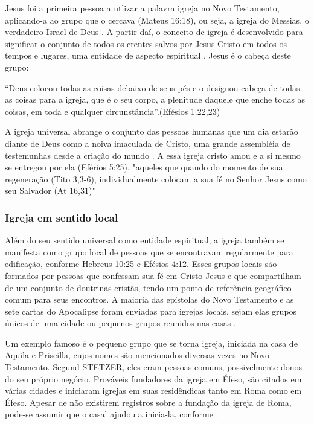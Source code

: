 \documentclass[
	12pt,				%
	openright,			%
	twoside,			%
	a4paper,			%
	english,			%
	french,				%
	spanish,			%
	brazil				%
	]{abntex2}
\begin{document}
Jesus foi a primeira pessoa a utlizar a palavra igreja no Novo Testamento, aplicando-a ao grupo que o cercava (Mateus 16:18), ou seja, a igreja do Messias, o verdadeiro Israel de Deus \cite[911]{berkhof}. A partir daí, o conceito de igreja é desenvolvido para significar o conjunto de todos os crentes salvos por Jesus Cristo em todos os tempos e lugares, uma entidade de aspecto espiritual \cite[318]{zac}. Jesus é o cabeça deste grupo:
\begin{citacao}“Deus colocou todas as coisas debaixo de seus pés e o designou cabeça de todas as coisas para a igreja, que é o seu corpo, a plenitude daquele que enche todas as coisas, em toda e qualquer circunstância”.(Efésios 1.22,23)
\end{citacao}

A igreja universal abrange o conjunto das pessoas humanas que um dia estarão diante de Deus como a noiva imaculada de Cristo, uma grande assembléia de testemunhas desde a criação do mundo \cite[607]{bavinck}. A essa igreja cristo amou e a si mesmo se entregou por ela (Eférios 5:25), "aqueles que quando do momento de sua regeneração (Tito 3,3-6), individualmente colocam a sua fé no Senhor Jesus como seu Salvador (At 16,31)" \cite[319]{zac}

\subsubsection{Igreja em sentido local}


Além do seu sentido universal como entidade espiritual, a igreja também se manifesta como grupo local de pessoas que se encontravam regularmente para edificação, conforme Hebreus 10:25 e Efésios 4:12. Esses grupos locais são formados por pessoas que confessam sua fé em Cristo Jesus e que compartilham de um conjunto de doutrinas cristãs, tendo um ponto de referência geográfico comum para seus encontros. A maioria das epístolas do Novo Testamento e as sete cartas do Apocalipse foram enviadas para igrejas locais, sejam elas grupos únicos de uma cidade ou pequenos grupos reunidos nas casas \cite[320]{zac}. 

Um exemplo famoso é o pequeno grupo que se torna igreja, iniciada na casa de Aquila e Priscilla, cujos nomes são mencionados diversas vezes no Novo Testamento. Segund STETZER, eles eram pessoas comuns, possivelmente donos do seu próprio negócio. Prováveis fundadores da igreja em Éfeso, são citados em várias cidades e iniciaram igrejas em suas residêndicas tanto em Roma como em Éfeso. Apesar de não existirem registros sobre a fundação da igreja de Roma, pode-se assumir que o casal ajudou a inicia-la, conforme \cite[54]{stetzer}.
\end{document}
